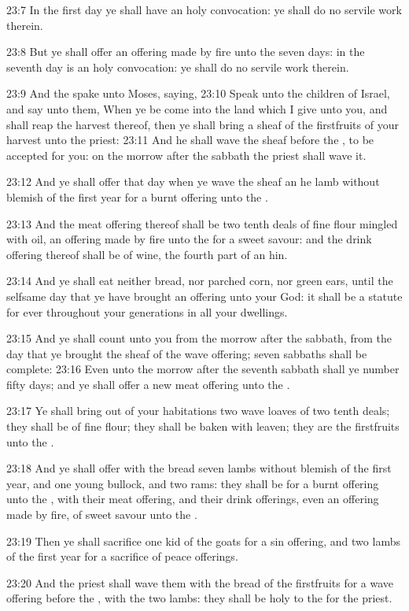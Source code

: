 23:7 In the first day ye shall have an holy convocation: ye shall do no servile work therein.

23:8 But ye shall offer an offering made by fire unto the \LORD seven days: in the seventh day is an holy convocation: ye shall do no servile work therein.

23:9 And the \LORD spake unto Moses, saying, 23:10 Speak unto the children of Israel, and say unto them, When ye be come into the land which I give unto you, and shall reap the harvest thereof, then ye shall bring a sheaf of the firstfruits of your harvest unto the priest: 23:11 And he shall wave the sheaf before the \LORD, to be accepted for you: on the morrow after the sabbath the priest shall wave it.

23:12 And ye shall offer that day when ye wave the sheaf an he lamb without blemish of the first year for a burnt offering unto the \LORD.

23:13 And the meat offering thereof shall be two tenth deals of fine flour mingled with oil, an offering made by fire unto the \LORD for a sweet savour: and the drink offering thereof shall be of wine, the fourth part of an hin.

23:14 And ye shall eat neither bread, nor parched corn, nor green ears, until the selfsame day that ye have brought an offering unto your God: it shall be a statute for ever throughout your generations in all your dwellings.

23:15 And ye shall count unto you from the morrow after the sabbath, from the day that ye brought the sheaf of the wave offering; seven sabbaths shall be complete: 23:16 Even unto the morrow after the seventh sabbath shall ye number fifty days; and ye shall offer a new meat offering unto the \LORD.

23:17 Ye shall bring out of your habitations two wave loaves of two tenth deals; they shall be of fine flour; they shall be baken with leaven; they are the firstfruits unto the \LORD.

23:18 And ye shall offer with the bread seven lambs without blemish of the first year, and one young bullock, and two rams: they shall be for a burnt offering unto the \LORD, with their meat offering, and their drink offerings, even an offering made by fire, of sweet savour unto the \LORD.

23:19 Then ye shall sacrifice one kid of the goats for a sin offering, and two lambs of the first year for a sacrifice of peace offerings.

23:20 And the priest shall wave them with the bread of the firstfruits for a wave offering before the \LORD, with the two lambs: they shall be holy to the \LORD for the priest.

